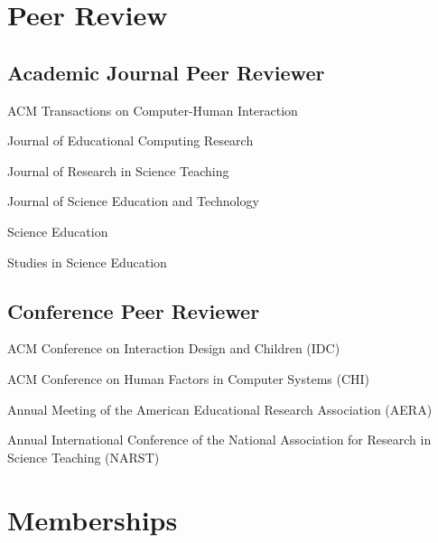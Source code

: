 \documentclass[11pt,letterpaper]{report} %
\newcommand{\listitemspace}{0.25em}
\renewenvironment{itemize}
{\begin{list}{}{\setlength{\leftmargin}{0em}
                \setlength{\parskip}{0em}
                \setlength{\itemsep}{\listitemspace}
                \setlength{\parsep}{\listitemspace}}}
{\end{list}}
\begin{document}

    \section*{Peer Review}

    \subsection*{Academic Journal Peer Reviewer}

    \begin{itemize}

        \item ACM Transactions on Computer-Human Interaction
        \item Journal of Educational Computing Research
        \item Journal of Research in Science Teaching
        \item Journal of Science Education and Technology
        \item Science Education
        \item Studies in Science Education

    \end{itemize}


    \subsection*{Conference Peer Reviewer}

    \begin{itemize}

        \item ACM Conference on Interaction Design and Children (IDC)
        \item ACM Conference on Human Factors in Computer Systems (CHI)
        \item Annual Meeting of the American Educational Research Association (AERA)%
        \item Annual International Conference of the National Association for Research in Science Teaching (NARST)

    \end{itemize}



    \section*{Memberships}
\end{document}
